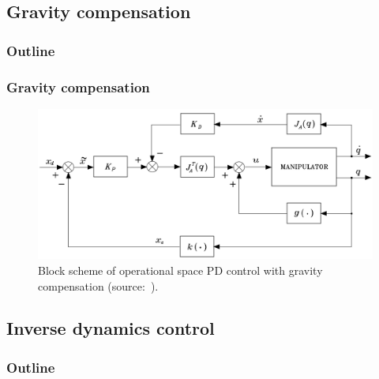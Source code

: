 \documentclass[10pt, aspectratio=169]{beamer}
\theoremstyle{remark}
\theoremstyle{definition}
\begin{document}
\subsection{Gravity compensation}

\begin{frame}
	\frametitle{Outline} %
\end{frame}

\begin{frame}[allowframebreaks]
\frametitle{Gravity compensation}

    \begin{figure}
        \centering
        \includegraphics[width=0.75\linewidth]{images/gravity_compensation_operational.png}
        \caption{Block scheme of operational space PD control with gravity compensation (source:~\cite{sciavicco2010robotics}).}
        \label{fig:gravity_compensation_operational}
    \end{figure}
    
\end{frame}

\subsection{Inverse dynamics control}

\begin{frame}
	\frametitle{Outline} %
\end{frame}
\end{document}

